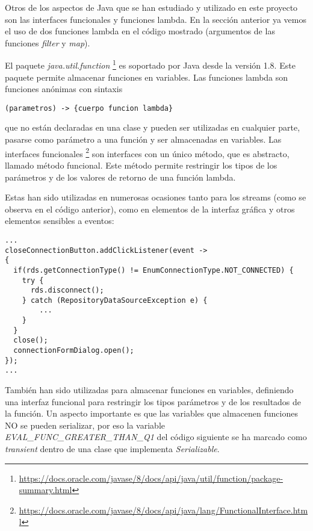 Otros de los aspectos de Java que se han estudiado y utilizado en este proyecto son las interfaces funcionales y funciones lambda. En la sección anterior ya vemos el uso de dos funciones lambda en el código mostrado (argumentos de las funciones \textit{filter} y \textit{map}).

El paquete \textit{java.util.function} \footnote{\url{https://docs.oracle.com/javase/8/docs/api/java/util/function/package-summary.html}} es soportado por Java desde la versión 1.8. Este paquete permite almacenar funciones en variables. Las funciones lambda son funciones anónimas con sintaxis \\
\begin{minipage}{\linewidth}
{\tiny
\begin{lstlisting}
(parametros) -> {cuerpo funcion lambda}
\end{lstlisting}
}
\end{minipage}
que no están declaradas en una clase y pueden ser utilizadas en cualquier parte, pasarse como parámetro a una función y ser almacenadas en variables. Las interfaces funcionales \footnote{\url{https://docs.oracle.com/javase/8/docs/api/java/lang/FunctionalInterface.html}} son interfaces con un único método, que es abstracto, llamado método funcional. Este método permite restringir los tipos de los parámetros y de los valores de retorno de una función lambda.

Estas han sido utilizadas en numerosas ocasiones tanto para los streams (como se observa en el código anterior), como en elementos de la interfaz gráfica y otros elementos sensibles a eventos:\\
\begin{minipage}{\linewidth}
{\tiny
\begin{lstlisting}[breaklines]
...
closeConnectionButton.addClickListener(event ->  
{
  if(rds.getConnectionType() != EnumConnectionType.NOT_CONNECTED) {
	try {
	  rds.disconnect();
	} catch (RepositoryDataSourceException e) {
		...
	}
  }
  close();
  connectionFormDialog.open();
});
...
\end{lstlisting}
}
\end{minipage}

También han sido utilizadas para almacenar funciones en variables, definiendo una interfaz funcional para restringir los tipos parámetros y de los resultados de la función. Un aspecto importante es que las variables que almacenen funciones NO se pueden serializar, por eso la variable \textit{EVAL\_FUNC\_GREATER\_THAN\_Q1} del código siguiente se ha marcado como \textit{transient} dentro de una clase que implementa \textit{Serializable}.


